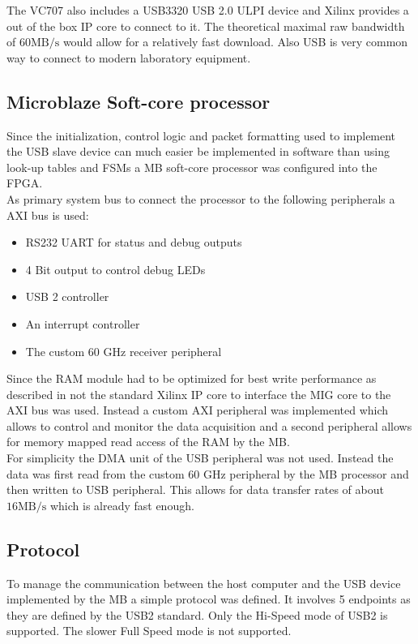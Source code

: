 The VC707 also includes a USB3320 USB 2.0 ULPI device and Xilinx provides
a out of the box \gls{IP} core to connect to it. The theoretical maximal
raw bandwidth of $60 \text{MB}/\text{s}$ would allow for a relatively fast
download. Also \gls{USB} is very common way to connect to modern laboratory
equipment.

\subsection{Microblaze Soft-core processor}
Since the initialization, control logic and packet formatting
used to implement the \gls{USB} slave device can much easier be implemented
in software than using look-up tables and \glspl{FSM} a
\gls{MB} soft-core processor was configured into the \gls{FPGA}. \\

As primary system bus to connect the processor to the following peripherals
a \gls{AXI} bus is used:
\begin{itemize}
\item RS232 \gls{UART} for status and debug outputs
\item 4 Bit output to control debug \glspl{LED}
\item USB 2 controller
\item An interrupt controller
\item The custom 60 GHz receiver peripheral
\end{itemize}

Since the \gls{RAM} module had to be optimized for best write performance
as described in  not the standard Xilinx \gls{IP}
core to interface the \gls{MIG} core to the \gls{AXI} bus was used.
Instead a custom \gls{AXI} peripheral was implemented which allows to
control and monitor the data acquisition and a second peripheral allows
for memory mapped read access of the \gls{RAM} by the \gls{MB}. \\

For simplicity the \gls{DMA} unit of the \gls{USB} peripheral was not used.
Instead the data was first read from the custom 60 GHz peripheral
by the \gls{MB} processor and then written to \gls{USB} peripheral.
This allows for data transfer rates of about $16 \text{MB} / \text{s}$
which is already fast enough. \\

\subsection{Protocol}
To manage the communication between the host computer and the \gls{USB} device
implemented by the \gls{MB} a simple protocol was defined.
It involves 5 endpoints as they are defined by the \gls{USB}2 standard.
Only the Hi-Speed mode of \gls{USB}2 is supported. The slower Full Speed mode
is not supported. \\

